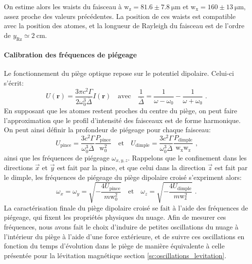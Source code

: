 On estime alors les waists du faisceau à $\mathrm{w_z}=81.6\pm\SI{7.8}{\micro\metre}$ et $\mathrm{w_x}=160\pm \SI{13}{\micro\metre}$, assez proche des valeurs précédentes. La position de ces waists est compatible avec la position des atomes, et la longueur de Rayleigh du faisceau est de l'ordre de $y_{\mathrm{Rz}}\simeq \SI{2}{\centi\metre}$.








\paragraph*{Calibration des fréquences de piégeage}
Le fonctionnement du piège optique repose sur le potentiel dipolaire. Celui-ci s'écrit:
\begin{equation}
U(\mathbf{r})=\frac{3 \pi c^2 \Gamma}{2 \omega_0^3 \overline{\Delta}} I(\mathbf{r}) \quad \text{avec} \quad \frac{1}{\overline{\Delta}}=\frac{1}{\omega-\omega_0}-\frac{1}{\omega+\omega_0} \text{ .}
\end{equation}
En supposant que les atomes restent proches du centre du piège, on peut faire l'approximation que le profil d'intensité des faisceaux est de forme harmonique. On peut ainsi définir la profondeur de piégeage pour chaque faisceau:
\begin{equation}
U_{\mathrm{pince}}= \frac{3c^2 \Gamma }{\omega_0^3 \overline{\Delta}} \frac{P_{\mathrm{pince}}}{\mathrm{w}_0^2} \quad \text{et} \quad U_{\mathrm{dimple}}=\frac{3c^2 \Gamma }{\omega_0^3 \overline{\Delta}}\frac{P_{\mathrm{dimple}}}{\mathrm{w}_{\mathrm{x}} \mathrm{w}_{\mathrm{z}}} \text{ ,}
\label{eq:profondeur_piege_optique}
\end{equation}
ainsi que les fréquences de piégeage $\omega_{x,y,z}$. Rappelons que le confinement dans les directions $\vec{x}$ et $\vec{y}$ est fait par la pince, et que celui dans la direction $\vec{z}$ est fait par le dimple, les fréquences de piégeage du piège dipolaire croisé s'expriment alors:
\begin{equation}
\omega_x=\omega_y=\sqrt{-\frac{4 U_{\mathrm{pince}}}{m \mathrm{w}_0^2}} \quad \text{et} \quad \omega_z=\sqrt{-\frac{4U_{\mathrm{dimple}}}{m \mathrm{w}_{\mathrm{z}}^2}} \text{ .}
\label{eq:frequences_piege_optique}
\end{equation}
La caractérisation finale du piège dipolaire croisé se fait à l'aide des fréquences de piégeage, qui fixent les propriétés physiques du nuage. Afin de mesurer ces fréquences, nous avons fait le choix d'induire de petites oscillations du nuage à l'intérieur du piège à l'aide d'une force extérieure, et de suivre ces oscillations en fonction du temps d'évolution dans le piège de manière équivalente à celle présentée pour la lévitation magnétique section \ref{sc:oscillations_levitation}. 

